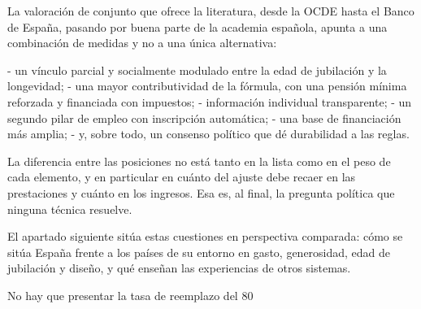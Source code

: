 \documentclass[10pt,a4paper]{article}
\begin{document}
La valoración de conjunto que ofrece la literatura, desde la OCDE hasta el Banco de España, pasando por buena parte de la academia española, apunta a una combinación de medidas y no a una única alternativa:

- un vínculo parcial y socialmente modulado entre la edad de jubilación y la longevidad;
- una mayor contributividad de la fórmula, con una pensión mínima reforzada y financiada con impuestos;
- información individual transparente;
- un segundo pilar de empleo con inscripción automática;
- una base de financiación más amplia;
- y, sobre todo, un consenso político que dé durabilidad a las reglas.

La diferencia entre las posiciones no está tanto en la lista como en el peso de cada elemento, y en particular en cuánto del ajuste debe recaer en las prestaciones y cuánto en los ingresos. Esa es, al final, la pregunta política que ninguna técnica resuelve.

El apartado siguiente sitúa estas cuestiones en perspectiva comparada: cómo se sitúa España frente a los países de su entorno en gasto, generosidad, edad de jubilación y diseño, y qué enseñan las experiencias de otros sistemas.


No hay que presentar la tasa de reemplazo del 80%
\end{document}

